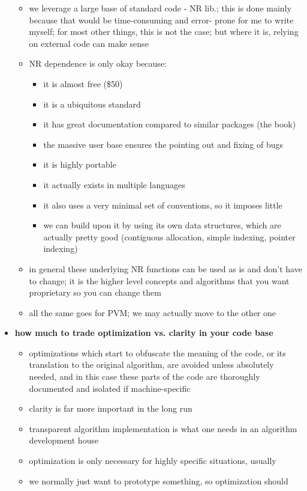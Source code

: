 \begin{itemize}
\begin{itemize}
	\item we leverage a large base of standard code - NR lib.;
			this is done mainly because that would be time-consuming and error-
				prone for me to write myself; for most other things, this is not
				the case; but where it is, relying on external code can make 
				sense
	\item NR dependence is only okay because:
		\begin{itemize}
		\item it is almost free (\$50)
		\item it is a ubiquitous standard
		\item it has great documentation compared to similar packages (the book)
		\item the massive user base ensures the pointing out and fixing of bugs
		\item it is highly portable
		\item it actually exists in multiple languages
		\item it also uses a very minimal set of conventions, so it imposes little
		\item we can build upon it by using its own data structures, which are 
				actually pretty good (contiguous allocation, simple indexing,
				pointer indexing)
		\end{itemize}
	\item in general these underlying NR functions can be used as is and don't
		have to change; it is the higher level concepts and algorithms that
		you want proprietary so you can change them
	\item all the same goes for PVM; we may actually move to the other one
	\end{itemize}
\item {\bf how much to trade optimization vs. clarity in your code base}
	\begin{itemize}
	\item optimizations which start to obfuscate the meaning of the code, or its
			translation to the original algorithm, are avoided unless absolutely
			needed, and in this case these parts of the code are thoroughly
			documented and isolated if machine-specific
	\item clarity is far more important in the long run
	\item transparent algorithm implementation is what one needs in an 
			algorithm development house
	\item optimization is only necessary for highly specific situations, usually
	\item we normally just want to prototype something, so optimization should

\end{itemize}
\end{itemize}

